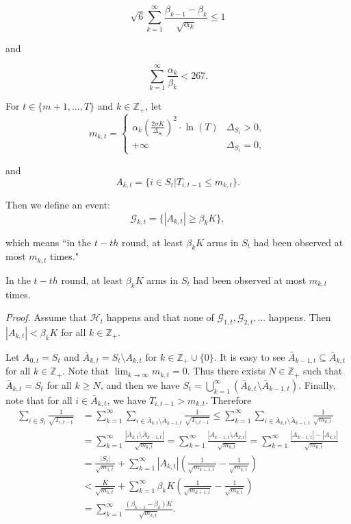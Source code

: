 \documentclass[opre,sglanonrev]{informs4}
\begin{document}
\begin{equation}\sqrt{6}\sum_{k=1}^\infty\frac{\beta_{k-1}-\beta_k}{\sqrt{\alpha_k}}\leq1\end{equation}

and

\begin{equation}\sum_{k=1}^\infty\frac{\alpha_k}{\beta_k}<267.\end{equation}

For $t \in \{m+1,...,T\}$ and $k \in \mathbb{Z}_+$, let
$$m_{k,t}=
\begin{cases}
\alpha_k\left(\frac{2\sigma K}{\Delta_{S_t}}\right)^2\cdot \ln(T) & \Delta_{S_t}>0, \\
+\infty & \Delta_{S_t}=0,
\end{cases}$$

and 
$$ A_{k,t} = \{i \in S_t|T_{i,t-1}\leq m_{k,t}\}.$$

Then we define an event:
$$\mathcal{G}_{k,t}=\{|A_{k,t}|\geq\beta_kK\},$$

which means “in the $t-th$ round, at least $\beta_{k}K$ arms in $S_{t}$ had been observed at most $m_{k,t}$ times."

\begin{lemma}
In the $t-th$ round, at least $\beta_{k}K$ arms in $S_t$ had been observed at most $m_{k,t}$ times.
\end{lemma}

\textit{Proof.} Assume that $\mathcal{H}_t$ happens and that none of $\mathcal{G}_{1,t},\mathcal{G}_{2,t},...$ happens. Then $|A_{k,t}|<\beta_{k}K$ for all $k\in \mathbb{Z}_+$.

Let $A_{0,t} = S_t$ and $\bar{A}_{k,t}=S_t\setminus A_{k,t}$ for $k\in \mathbb{Z}_+\cup \{0\}$. It is easy to see $\bar{A}_{k-1,t}\subseteq\bar{A}_{k,t}$ for all $k\in \mathbb{Z}_+$. Note that $\lim_{k \to \infty}m_{k,t}=0$. Thus there exists $N\in \mathbb{Z}_+$ such that $\bar{A}_{k,t}=S_t$ for all $k\geq N$, and then we have $S_t=\bigcup_{k=1}^\infty\left(\bar{A}_{k,t}\setminus\bar{A}_{k-1,t}\right)$. Finally, note that for all $i\in \bar{A}_{k,t}$, we have $T_{i,t-1}>m_{k,t}$. Therefore
$$\begin{aligned}
\sum_{i\in S_t}\frac{1}{\sqrt{T_{i,t-1}}} & =\sum_{k=1}^\infty\sum_{i\in\bar{A}_{k,t}\setminus\bar{A}_{k-1,t}}\frac{1}{\sqrt{T_{i,t-1}}}\leq\sum_{k=1}^\infty\sum_{i\in\bar{A}_{k,t}\setminus\bar{A}_{k-1,t}}\frac{1}{\sqrt{m_{k,t}}} \\
 & =\sum_{k=1}^\infty\frac{\left|\bar{A}_{k,t}\setminus\bar{A}_{k-1,t}\right|}{\sqrt{m_{k,t}}}=\sum_{k=1}^\infty\frac{\left|A_{k-1,t}\setminus A_{k,t}\right|}{\sqrt{m_{k,t}}}=\sum_{k=1}^\infty\frac{\left|A_{k-1,t}\right|-\left|A_{k,t}\right|}{\sqrt{m_{k,t}}} \\
 & =\frac{|S_t|}{\sqrt{m_{1,t}}}+\sum_{k=1}^\infty|A_{k,t}|\left(\frac{1}{\sqrt{m_{k+1,t}}}-\frac{1}{\sqrt{m_{k,t}}}\right) \\
 & <\frac{K}{\sqrt{m_{1,t}}}+\sum_{k=1}^\infty\beta_kK\left(\frac{1}{\sqrt{m_{k+1,t}}}-\frac{1}{\sqrt{m_{k,t}}}\right) \\
 & =\sum_{k=1}^\infty\frac{(\beta_{k-1}-\beta_k)K}{\sqrt{m_{k,t}}}.
\end{aligned}$$
\end{document}
